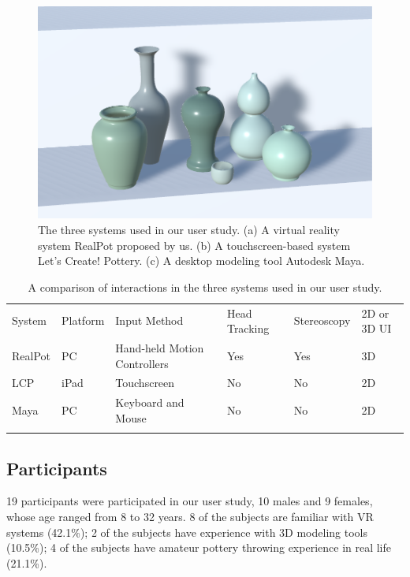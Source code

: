 \documentclass{svjour3}                     %
\begin{document}
\begin{figure}
\includegraphics[width=\textwidth]{fig11}
\caption{The three systems used in our user study. (a) A virtual reality system RealPot proposed by us. (b) A touchscreen-based system Let's Create! Pottery. (c) A desktop modeling tool Autodesk Maya.}
\label{fig:sys}
\end{figure}

\begin{table}
\caption{A comparison of interactions in the three systems used in our user study.}
\label{tab:3}       %
\begin{tabular}{llllll}
\hline\noalign{\smallskip}
System & Platform & Input Method & Head Tracking & Stereoscopy & 2D or 3D UI \\
\noalign{\smallskip}\hline\noalign{\smallskip}
RealPot & PC & Hand-held Motion Controllers & Yes & Yes & 3D \\
LCP & iPad & Touchscreen & No & No & 2D \\
Maya & PC & Keyboard and Mouse & No & No & 2D \\
\noalign{\smallskip}\hline
\end{tabular}
\end{table}

\subsection{Participants}
\label{sec:6.2}
19 participants were participated in our user study, 10 males and 9 females, whose age ranged from 8 to 32 years. 8 of the subjects are familiar with VR systems (42.1\%); 2 of the subjects have experience with 3D modeling tools (10.5\%); 4 of the subjects have amateur pottery throwing experience in real life (21.1\%).
\end{document}
